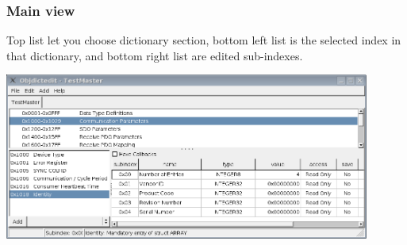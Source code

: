 \documentclass[a4paper,12pt]{book}
\begin{document}
\subsubsection{Main view}
Top list let you choose dictionary section, bottom left list is the
selected index in that dictionary, and bottom right list are edited
sub{}-indexes.

 \begin{center}
   \includegraphics[width=12cm]{Pictures/10000201000003E7000001C7B0296577.png}
\end{center}
\end{document}

